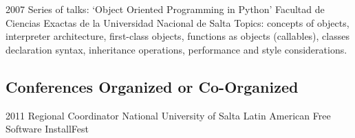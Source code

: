 \documentclass[11pt,a4paper]{moderncv}
\begin{document}
\cventry                                                                         %
    {2007}                                                                       %
    {Series of talks: `Object Oriented Programming in Python'}                   %
    {Facultad de Ciencias Exactas de la Universidad Nacional de Salta}           %
    {}                                                                           %
    {}                                                                           %
    {                                                                            %
        Topics:                                                                  %
        concepts of objects,                                                     %
        interpreter architecture,                                                %
        first-class objects,                                                     %
        functions as objects (callables),                                        %
        classes declaration syntax,                                              %
        inheritance operations,                                                  %
        performance and style considerations.                                    %
    }                                                                            %

    \subsection{Conferences Organized or Co-Organized}                           %

        \cventry                                                                 %
            {2011}                                                               %
            {Regional Coordinator}                                               %
            {National University of Salta}                                       %
            {}                                                                   %
            {Latin American Free Software InstallFest}                           %
            {}                                                                   %
\end{document}

